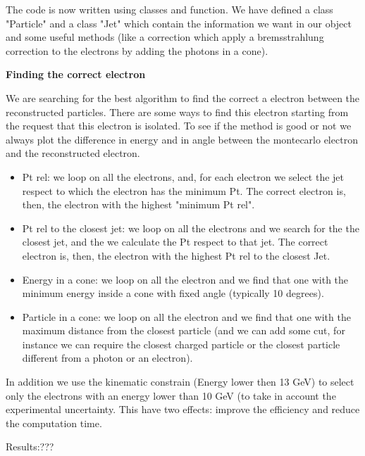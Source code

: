 The code is now written using classes and function.
We have defined a class "Particle" and a class "Jet" which contain the information we want in our object and some useful methods (like a correction which apply a bremsstrahlung correction to the electrons by adding the photons in a cone).

\textbf{Finding the correct electron}

We are searching for the best algorithm to find the correct a electron between the reconstructed particles. There are some ways to find this electron starting from the request that this electron is isolated. To see if the method is good or not we always plot the difference in energy and in angle between the montecarlo electron and the reconstructed electron.

\begin{itemize}
\item Pt rel: we loop on all the electrons, and, for each electron we select the jet respect to which the electron has the minimum Pt. The correct electron is, then, the electron with the highest "minimum Pt rel".\\
\item Pt rel to the closest jet: we loop on all the electrons and we search for the the closest jet, and the we calculate the Pt respect to that jet. The correct electron is, then, the electron with the highest Pt rel to the closest Jet.\\
\item Energy in a cone: we loop on all the electron and we find that one with the minimum energy inside a cone with fixed angle (typically 10 degrees).\\
\item Particle in a cone: we loop on all the electron and we find that one with the maximum distance from the closest particle (and we can add some cut, for instance we can require the closest charged particle or the closest particle different from a photon or an electron).
\end{itemize} 

In addition we use the kinematic constrain (Energy lower then 13 GeV) to select only the electrons with an energy lower than 10 GeV (to take in account the experimental uncertainty. This have two effects: improve the efficiency and reduce the computation time.

Results:???